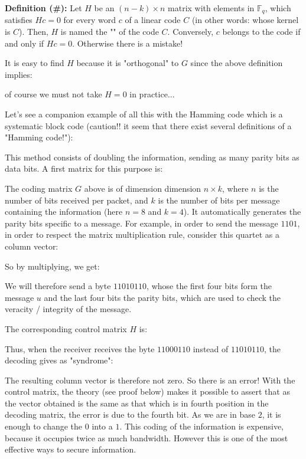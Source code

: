 	\textbf{Definition (\#\mydef):} Let $H$ be an $(n-k)\times n$ matrix with elements in $\mathbb{F}_q$, which satisfies $Hc=0$ for every word $c$ of a linear code $C$ (in other words: whose kernel is $C$). Then, $H$ is named the "" of the code $C$. Conversely, $c$ belongs to the code if and only if $Hc=0$. Otherwise there is a mistake!
	\begin{tcolorbox}[title=Remark,colframe=black,arc=10pt]
	It is easy to find $H$ because it is "orthogonal" to $G$ since the above definition implies:
	
	of course we must not take $H = 0$ in practice...
	\end{tcolorbox}
	Let's see a companion example of all this with the Hamming code which is a systematic block code (caution!! it seem that there exist several definitions of a "Hamming code!"):

	This method consists of doubling the information, sending as many parity bits as data bits. A first matrix for this purpose is:
	
	The coding matrix $G$ above is of dimension dimension $n\times k$, where $n$ is the number of bits received per packet, and $k$ is the number of bits per message containing the information (here $n=8$ and $k=4$). It automatically generates the parity bits specific to a message. For example, in order to send the message $1101$, in order to respect the matrix multiplication rule, consider this quartet as a column vector:
	
	So by multiplying, we get:
	
	We will therefore send a byte $11010110$, whose the first four bits form the message $u$ and the last four bits the parity bits, which are used to check the veracity / integrity of the message.

	The corresponding control matrix $H$ is:
	
	Thus, when the receiver receives the byte $11000110$ instead of $11010110$, the decoding gives as "syndrome":
	
	The resulting column vector is therefore not zero. So there is an error! With the control matrix, the theory (see proof below) makes it possible to assert that as the vector obtained is the same as that which is in fourth position in the decoding matrix, the error is due to the fourth bit. As we are in base $2$, it is enough to change the $0$ into a $1$. This coding of the information is expensive, because it occupies twice as much bandwidth. However this is one of the most effective ways to secure information.

